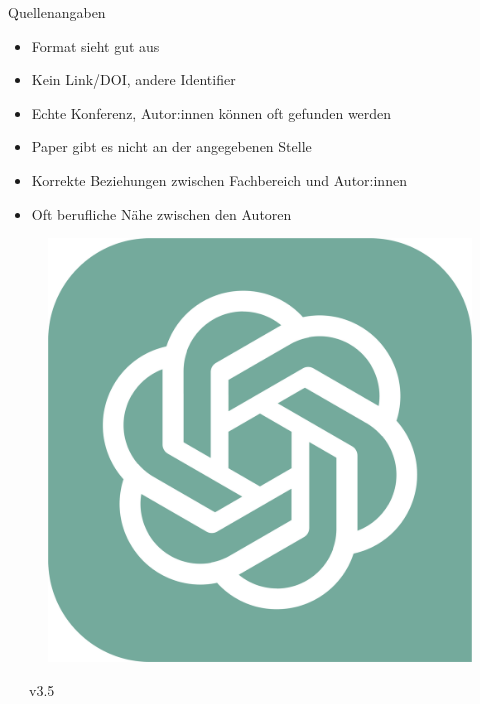 \documentclass[10pt,aspectratio=169]{beamer}
\begin{document}
\begin{frame}{Quellenangaben}
\begin{minipage}{0.5\linewidth}
    \begin{itemize}
        \item Format sieht gut aus
        \item Kein Link/DOI, andere Identifier
        \item Echte Konferenz, Autor:innen können oft gefunden werden
        \item Paper gibt es nicht an der angegebenen Stelle
        \item Korrekte Beziehungen zwischen Fachbereich und Autor:innen
        \item Oft berufliche Nähe zwischen den Autoren
    \end{itemize}
\end{minipage}
\begin{minipage}{0.05\linewidth}
        \scriptsize
        \begin{figure}[!ht]
            \includegraphics[width=\linewidth]{assets/ChatGPT_logo.pdf}
        \end{figure}
        \vspace{-2mm}
        ~~~v3.5
        \vspace{2.8cm}
        \begin{figure}[!ht]

\end{figure}
\end{minipage}
\end{frame}
\end{document}
